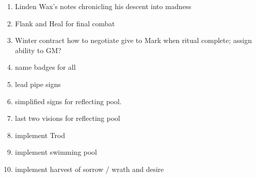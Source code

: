 \documentclass[green]{gl2018}
\begin{document}
\name{\gGMToDo{}}

\begin{enumerate}
\item Linden Wax's notes chronicling his descent into madness
\item Flank and Heal for final combat
\item Winter contract how to negotiate give to Mark when ritual complete; assign ability to GM?
\item name badges for all
\item lead pipe signs
\item simplified signs for reflecting pool.
\item last two visions for reflecting pool
\item implement Trod
\item implement swimming pool
\item	implement harvest of sorrow / wrath and desire

\end{enumerate}
\end{document}
